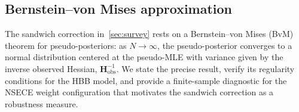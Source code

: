 
\subsection{Bernstein--von Mises approximation}
\label{smc:bvm}

The sandwich correction in~\cref{sec:survey} rests on a
Bernstein--von Mises (BvM) theorem for pseudo-posteriors: as
$N \to \infty$, the pseudo-posterior converges to a normal distribution
centered at the pseudo-MLE with variance given by the inverse observed
Hessian, $\mathbf{H}_{\mathrm{obs}}^{-1}$.  We state the precise result, verify its regularity
conditions for the HBB model, and provide a finite-sample
diagnostic for the NSECE weight configuration that motivates the
sandwich correction as a robustness measure.


